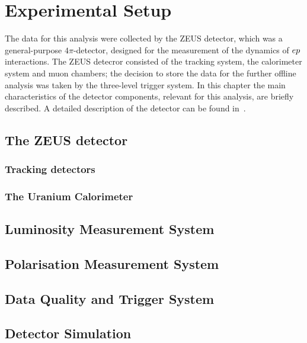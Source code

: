 \chapter{Experimental Setup}
\label{ch:expsetup}
The data for this analysis were collected by the ZEUS detector, which was a general-purpose $4\pi$-detector, designed for the measurement of the dynamics of $\mbox{$e p$}$ interactions. The ZEUS detecror consisted of the tracking system, the calorimeter system and muon chambers; the decision to store the data for the further offline analysis was taken by the three-level trigger system. In this chapter the main characteristics of the detector components, relevant for this analysis, are briefly described. A detailed description of the detector can be found in~\cite{zeus:1993:bluebook}.

\section{The ZEUS detector}
\label{subsec:zeusdet}


\subsection{Tracking detectors}
\label{subsec:trackdet}


\subsection{The Uranium Calorimeter}
\label{subsec:UCAL}


\section{Luminosity Measurement System}
\label{sec:lumimeas}


\section{Polarisation Measurement System}
\label{sec:polarmeas}


\section{Data Quality and Trigger System}
\label{sec:daqtrigger}


\section{Detector Simulation}
\label{sec:detsim}

